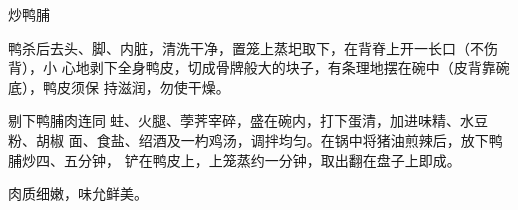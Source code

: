 \begin{recipe}{炒鸭脯}

\ingredients


\preparation

鸭杀后去头、脚、内脏，清洗干净，置笼上蒸圯取下，在背脊上开一长口（不伤背），小
心地剥下全身鸭皮，切成骨牌般大的块子，有条理地摆在碗中（皮背靠碗底），鸭皮须保
持滋润，勿使干燥。

剔下鸭脯肉连同𧎼蛀、火腿、荸荠宰碎，盛在碗内，打下蛋清，加进味精、水豆粉、胡椒
面、食盐、绍酒及一杓鸡汤，调拌均匀。在锅中将猪油煎辣后，放下鸭脯炒四、五分钟，
铲在鸭皮上，上笼蒸约一分钟，取出翻在盘子上即成。

\features

肉质细嫩，味允鲜美。

\end{recipe}

